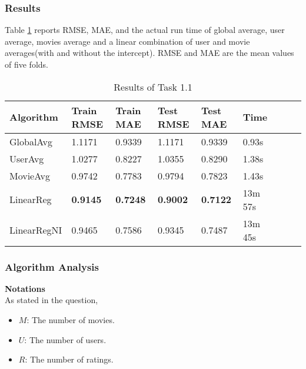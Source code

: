 \documentclass[12pt]{article}
\begin{document}
\subsubsection{Results}
Table \ref{tab:1.1-results} reports RMSE, MAE, and the actual run time of global average, user average, movies average and a linear combination of user and movie averages(with and without the intercept). RMSE and MAE are the mean values of five folds.
\begin{table}[ht]
    \centering
    \caption{Results of Task 1.1}
    \label{tab:1.1-results}
    \begin{threeparttable}
    \begin{tabular}{lllllllll}
        \toprule
        \textbf{Algorithm}  & \textbf{Train RMSE} & \textbf{Train MAE} & \textbf{Test RMSE} & \textbf{Test MAE} & \textbf{Time}\\
        \midrule
        GlobalAvg & 1.1171 & 0.9339 & 1.1171 & 0.9339 & 0.93s\\
        UserAvg & 1.0277 & 0.8227 & 1.0355 & 0.8290 & 1.38s\\
        MovieAvg & 0.9742 & 0.7783 & 0.9794 & 0.7823 & 1.43s\\
        LinearReg & \textbf{0.9145} & \textbf{0.7248} & \textbf{0.9002} & \textbf{0.7122} & 13m 57s\\
        LinearRegNI & 0.9465 & 0.7586 & 0.9345 & 0.7487 & 13m 45s\\
        \bottomrule
    \end{tabular}
    \end{threeparttable}
\end{table}

\subsubsection{Algorithm Analysis}
\noindent\textbf{Notations}\\
As stated in the question,
\begin{itemize}
    \item $M$: The number of movies.
    \item $U$: The number of users.
    \item $R$: The number of ratings.
\end{itemize}
\end{document}
